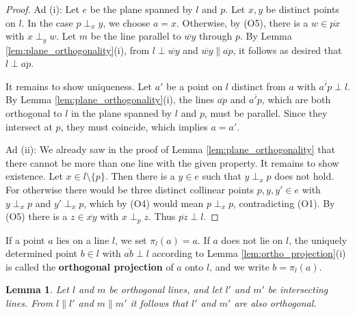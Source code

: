 \documentclass[11pt,a4paper]{article}
\newcommand{\ortho}[3]{#1 \perp_{#2} #3}
\newcommand{\lineab}[1]{\overline{#1}}
\newtheorem{lemma}[theorem]{Lemma}
\begin{document}
\begin{proof}
Ad (i): Let $e$ be the plane spanned by $l$ and $p$. Let $x, y$ be distinct points on $l$. In the case $\ortho{p}{x}{y}$, we choose $a = x$. Otherwise, by (O5), there is a $w \in \lineab{px}$ with $\ortho{x}{y}{w}$. Let $m$ be the line parallel to $\lineab{wy}$ through $p$. By Lemma \ref{lem:plane_orthogonality}(i), from $l \perp \lineab{wy}$ and $\lineab{wy} \parallel \lineab{ap}$, it follows as desired that $l \perp \lineab{ap}$.

It remains to show uniqueness. Let $a'$ be a point on $l$ distinct from $a$ with $\lineab{a'p} \perp l$. By Lemma \ref{lem:plane_orthogonality}(i), the lines $\lineab{ap}$ and $\lineab{a'p}$, which are both orthogonal to $l$ in the plane spanned by $l$ and $p$, must be parallel. Since they intersect at $p$, they must coincide, which implies $a = a'$.

Ad (ii): We already saw in the proof of Lemma \ref{lem:plane_orthogonality} that there cannot be more than one line with the given property. It remains to show existence.
Let $x \in l \setminus \{p\}$. Then there is a $y \in e$ such that $\ortho{y}{x}{p}$ does not hold. For otherwise there would be three distinct collinear points $p, y, y' \in e$ with $\ortho{y}{x}{p}$ and $\ortho{y'}{x}{p}$, which by (O4) would mean $\ortho{p}{x}{p}$, contradicting (O1). By (O5) there is a $z \in \lineab{xy}$ with $\ortho{x}{p}{z}$. Thus $\lineab{pz} \perp l$.
\end{proof}

If a point $a$ lies on a line $l$, we set $\pi_l(a) = a$. If $a$ does not lie on $l$, the uniquely determined point $b \in l$ with $\lineab{ab} \perp l$ according to Lemma \ref{lem:ortho_projection}(i) is called the \textbf{orthogonal projection} of $a$ onto $l$, and we write $b = \pi_l(a)$.

\begin{lemma} \label{lem:parallel_ortho_transport}
Let $l$ and $m$ be orthogonal lines, and let $l'$ and $m'$ be intersecting lines. From $l \parallel l'$ and $m \parallel m'$ it follows that $l'$ and $m'$ are also orthogonal.
\end{lemma}
\end{document}
